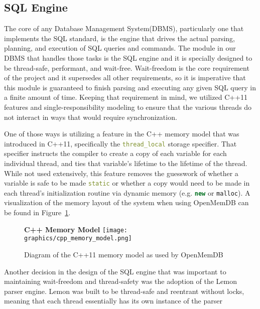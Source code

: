 \documentclass[letterpaper, 11pt]{article}
\newcommand{\inlinecode}[1]{\colorbox{codegrey}{\lstinline[language=C++]{#1}}}
\begin{document}
  \subsection{SQL Engine}
  The core of any Database Management System(DBMS), particularly one that implements the SQL standard, is the
  engine that drives the actual parsing, planning, and execution of SQL queries and commands.
  The module in our DBMS that handles those tasks is the SQL engine and it is specially designed to
  be thread-safe, performant, and wait-free. Wait-freedom is the core requirement of the project
  and it supersedes all other requirements, so it is imperative that this module is guaranteed to finish
  parsing and executing any given SQL query in a finite amount of time. Keeping
  that requirement in mind, we utilized C++11 features and single-responsibility modeling to
  ensure that the various threads do not interact in ways that would require synchronization.
  \par\vspace{\baselineskip}
  One of those ways is utilizing a feature in the C++ memory model that was introduced in C++11, specifically
  the \inlinecode{thread_local} storage specifier. That specifier instructs the compiler
  to create a copy of each variable for each individual thread, and ties that variable's lifetime
  to the lifetime of the thread. While not used extensively, this feature removes the guesswork
  of whether a variable is safe to be made \inlinecode{static} or whether a copy
  would need to be made in each thread's initialization routine via dynamic memory (e.g.
  \inlinecode{new} or \inlinecode{malloc}). A visualization of the memory layout of the system
  when using OpenMemDB can be found in Figure~\ref{fig:cpp_mem_model}.
  \par\vspace{\baselineskip}
  \begin{figure}[H]
   \centering
    \textbf{C++ Memory Model}
    \texttt{[image: graphics/cpp\_memory\_model.png]}
    \caption{Diagram of the C++11 memory model as used by OpenMemDB}
    \label{fig:cpp_mem_model}
  \end{figure}
  \par\vspace{\baselineskip}
  Another decision in the design of the SQL engine that was important to maintaining wait-freedom and
  thread-safety was the adoption of the Lemon parser engine. Lemon was built to be thread-safe and
  reentrant without locks, meaning that each thread essentially has its own instance of the parser
\end{document}

